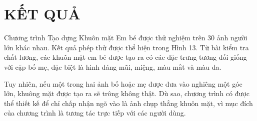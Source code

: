 \documentclass[journal]{IEEEtran}
\begin{document}
\section{KẾT QUẢ}
Chương trình Tạo dựng Khuôn mặt Em bé được thử nghiệm trên 30 ảnh người lớn khác nhau. Kết quả phép thử được thể hiện trong Hình 13. Từ bài kiểm tra chất lương, các khuôn mặt em bé được tạo ra có các đặc trưng tương đối giống với cặp bố mẹ, đặc biệt là hình dáng mũi, miệng, màu mắt và màu da.

Tuy nhiên, nếu một trong hai ảnh bố hoặc mẹ được đưa vào nghiêng một góc lớn, khuông mặt được tạo ra sẽ trông không thật. Dù sao, chương trình có được thể thiết kế để chỉ chấp nhận ngõ vào là ảnh chụp thẳng khuôn mặt, vì mục đích của chương trình là tương tác trực tiếp với các người dùng.

\begin{figure}[!t]
\centering
{}

\end{figure}
\end{document}
